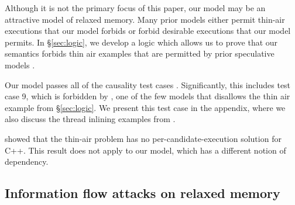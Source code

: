 Although it is not the primary focus of this paper, our model may be an
attractive model of relaxed memory.  Many prior models either permit
thin-air executions that our model forbids or forbid desirable executions
that our model permits.
In \S\ref{sec:logic}, we develop a logic which allows us to prove that our
semantics forbids thin air examples that are permitted by prior speculative
models
\cite{Manson:2005:JMM:1047659.1040336,DBLP:conf/esop/JagadeesanPR10,DBLP:conf/popl/KangHLVD17}.

Our model passes all of the causality test cases
\cite{PughWebsite}.  Significantly, this
includes test case 9, which is forbidden by \cite{DBLP:conf/lics/JeffreyR16},
one of the few models that disallows the thin air example from
\S\ref{sec:logic}.  We present this test case in the appendix, where we also
discuss the thread inlining examples from
\cite{Manson:2005:JMM:1047659.1040336}.

\citet{DBLP:conf/esop/BattyMNPS15} showed that the thin-air problem has
no per-candidate-execution solution for C++.  This result does not apply to
our model, which has a different notion of dependency.

\subsection{Information flow attacks on relaxed memory}
\label{sec:info-flow-attack}

